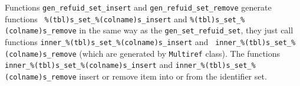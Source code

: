 \documentclass[deska]{subfiles}
\begin{document}
Functions {\tt gen\_refuid\_set\_insert} and {\tt gen\_refuid\_set\_remove} generate functions {\tt 
\%(tbl)s\_set\_\%(colname)s\_insert} and {\tt \%(tbl)s\_set\_\%(colname)s\_remove} in the same way as 
the {\tt gen\_set\_refuid\_set}, they just call functions {\tt inner\_\%(tbl)s\_set\_\%(colname)s\_insert} and {\tt
inner\_\%(tbl)s\_set\_\%(colname)s\_remove} (which are generated by {\tt Multiref} class).  The functions {\tt
inner\_\%(tbl)s\_set\_\%(colname)s\_insert} and {\tt inner\_\%(tbl)s\_set\_\%(colname)s\_remove} insert or remove item
into or from the identifier set.
\end{document}
